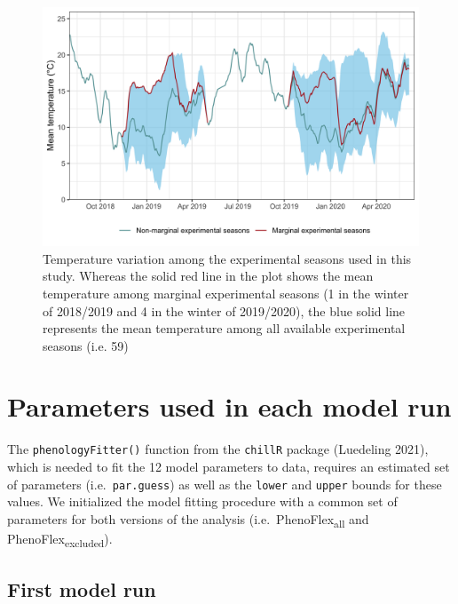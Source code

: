 \documentclass[
]{article}
\begin{document}
\begin{figure}

{\centering \includegraphics[width=0.9\linewidth]{figures/supplementary_conditions_2} 

}

\caption{Temperature variation among the experimental seasons used in this study. Whereas the solid red line in the plot shows the mean temperature among marginal experimental seasons (1 in the winter of 2018/2019 and 4 in the winter of 2019/2020), the blue solid line represents the mean temperature among all available experimental seasons (i.e. 59)}\label{fig:fig_s3}
\end{figure}

\hypertarget{parameters-used-in-each-model-run}{%
\section{Parameters used in each model
run}\label{parameters-used-in-each-model-run}}

The \texttt{phenologyFitter()} function from the \texttt{chillR} package
(Luedeling 2021), which is needed to fit the 12 model parameters to
data, requires an estimated set of parameters (i.e.~\texttt{par.guess})
as well as the \texttt{lower} and \texttt{upper} bounds for these
values. We initialized the model fitting procedure with a common set of
parameters for both versions of the analysis
(i.e.~PhenoFlex\textsubscript{all} and
PhenoFlex\textsubscript{excluded}).

\hypertarget{first-model-run}{%
\subsection{First model run}\label{first-model-run}}
\end{document}
